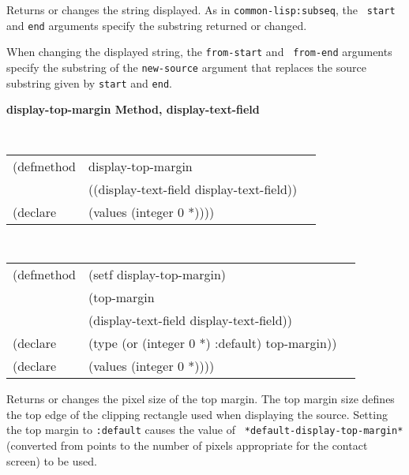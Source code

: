 \begin{flushright} \parbox[t]{6.125in}{
Returns or changes the string displayed. As in {\tt common-lisp:subseq}, the {\tt
start} and {\tt end} arguments specify the substring returned or
changed.

When changing the displayed string, the {\tt from-start} and {\tt
from-end} arguments specify the substring of the {\tt new-source}
argument that replaces the source substring given by {\tt start} and
{\tt end}.}
 \end{flushright}



{\samepage  
{\large {\bf display-top-margin \hfill Method, display-text-field}}
\begin{flushright} \parbox[t]{6.125in}{
\tt
\begin{tabular}{lll}
\raggedright
(defmethod & display-top-margin & \\
& ((display-text-field  display-text-field)) \\
(declare & (values (integer 0 *))))
\end{tabular}
\rm

}\end{flushright}}

\begin{flushright} \parbox[t]{6.125in}{
\tt
\begin{tabular}{lll}
\raggedright
(defmethod & (setf display-top-margin) & \\
         & (top-margin \\
         & (display-text-field  display-text-field)) \\
(declare &(type (or (integer 0 *) :default)  top-margin))\\
(declare & (values (integer 0 *))))
\end{tabular}
\rm}
\end{flushright}

\begin{flushright} \parbox[t]{6.125in}{
Returns or changes the pixel size of the
top margin.  The top margin size defines
the top edge of the clipping rectangle used when displaying the source.
Setting the top margin to {\tt :default} causes the value of {\tt
*default-display-top-margin*} (converted from points to the number of pixels
appropriate for the contact screen) to be used.
}
\end{flushright}


